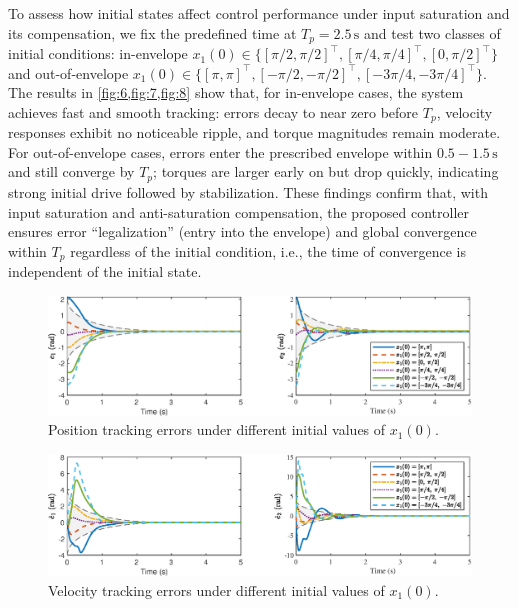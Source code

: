 \documentclass[pdflatex,sn-mathphys-num]{sn-jnl}%
\theoremstyle{thmstyleone}%
\theoremstyle{thmstyletwo}%
\theoremstyle{thmstylethree}%
\begin{document}
To assess how initial states affect control performance under input saturation and its compensation, we fix the predefined time at $T_p=2.5\,\mathrm{s}$ and test two classes of initial conditions: in-envelope $x_1(0)\in\{[\pi/2,\pi/2]^{\!\top},[\pi/4,\pi/4]^{\!\top},[0,\pi/2]^{\!\top}\}$ and out-of-envelope $x_1(0)\in\{[\pi,\pi]^{\!\top},[-\pi/2,-\pi/2]^{\!\top},[-3\pi/4,-3\pi/4]^{\!\top}\}$. The results in \cref{fig:6,fig:7,fig:8} show that, for in-envelope cases, the system achieves fast and smooth tracking: errors decay to near zero before $T_p$, velocity responses exhibit no noticeable ripple, and torque magnitudes remain moderate. For out-of-envelope cases, errors enter the prescribed envelope within $0.5\!-\!1.5\,\mathrm{s}$ and still converge by $T_p$; torques are larger early on but drop quickly, indicating strong initial drive followed by stabilization. These findings confirm that, with input saturation and anti-saturation compensation, the proposed controller ensures error “legalization” (entry into the envelope) and global convergence within $T_p$ regardless of the initial condition, i.e., the time of convergence is independent of the initial state.

\begin{figure}[H]
	\centering
	\includegraphics[width=0.9\linewidth]{fig6.eps}
	\caption{Position tracking errors under different initial values of \(x_1(0)\).}
	\label{fig:6}
\end{figure}

\begin{figure}[H]
	\centering
	\includegraphics[width=0.9\linewidth]{fig7.eps}
	\caption{Velocity tracking errors under different initial values of \(x_1(0)\).}
	\label{fig:7}
\end{figure}
\end{document}

